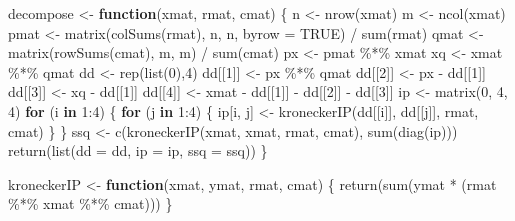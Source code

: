 \documentclass[
  12pt,
  letterpaper,
  DIV=11,
  numbers=noendperiod]{scrartcl}
\newenvironment{Shaded}{\begin{snugshade}}{\end{snugshade}}
\newcommand{\AttributeTok}[1]{\textcolor[rgb]{0.40,0.45,0.13}{#1}}
\newcommand{\ConstantTok}[1]{\textcolor[rgb]{0.56,0.35,0.01}{#1}}
\newcommand{\ControlFlowTok}[1]{\textcolor[rgb]{0.00,0.23,0.31}{\textbf{#1}}}
\newcommand{\DecValTok}[1]{\textcolor[rgb]{0.68,0.00,0.00}{#1}}
\newcommand{\FunctionTok}[1]{\textcolor[rgb]{0.28,0.35,0.67}{#1}}
\newcommand{\NormalTok}[1]{\textcolor[rgb]{0.00,0.23,0.31}{#1}}
\newcommand{\OtherTok}[1]{\textcolor[rgb]{0.00,0.23,0.31}{#1}}
\newcommand{\SpecialCharTok}[1]{\textcolor[rgb]{0.37,0.37,0.37}{#1}}
\begin{document}
\begin{Shaded}
\begin{Highlighting}[]
\NormalTok{decompose }\OtherTok{\textless{}{-}} \ControlFlowTok{function}\NormalTok{(xmat, rmat, cmat) \{}
\NormalTok{  n }\OtherTok{\textless{}{-}} \FunctionTok{nrow}\NormalTok{(xmat)}
\NormalTok{  m }\OtherTok{\textless{}{-}} \FunctionTok{ncol}\NormalTok{(xmat)}
\NormalTok{  pmat }\OtherTok{\textless{}{-}} \FunctionTok{matrix}\NormalTok{(}\FunctionTok{colSums}\NormalTok{(rmat), n, n, }\AttributeTok{byrow =} \ConstantTok{TRUE}\NormalTok{) }\SpecialCharTok{/} \FunctionTok{sum}\NormalTok{(rmat)}
\NormalTok{  qmat }\OtherTok{\textless{}{-}} \FunctionTok{matrix}\NormalTok{(}\FunctionTok{rowSums}\NormalTok{(cmat), m, m) }\SpecialCharTok{/} \FunctionTok{sum}\NormalTok{(cmat)}
\NormalTok{  px }\OtherTok{\textless{}{-}}\NormalTok{ pmat }\SpecialCharTok{\%*\%}\NormalTok{ xmat}
\NormalTok{  xq }\OtherTok{\textless{}{-}}\NormalTok{ xmat }\SpecialCharTok{\%*\%}\NormalTok{ qmat}
\NormalTok{  dd }\OtherTok{\textless{}{-}} \FunctionTok{rep}\NormalTok{(}\FunctionTok{list}\NormalTok{(}\DecValTok{0}\NormalTok{),}\DecValTok{4}\NormalTok{) }
\NormalTok{  dd[[}\DecValTok{1}\NormalTok{]] }\OtherTok{\textless{}{-}}\NormalTok{ px }\SpecialCharTok{\%*\%}\NormalTok{ qmat}
\NormalTok{  dd[[}\DecValTok{2}\NormalTok{]] }\OtherTok{\textless{}{-}}\NormalTok{ px }\SpecialCharTok{{-}}\NormalTok{ dd[[}\DecValTok{1}\NormalTok{]]}
\NormalTok{  dd[[}\DecValTok{3}\NormalTok{]] }\OtherTok{\textless{}{-}}\NormalTok{ xq }\SpecialCharTok{{-}}\NormalTok{ dd[[}\DecValTok{1}\NormalTok{]]}
\NormalTok{  dd[[}\DecValTok{4}\NormalTok{]] }\OtherTok{\textless{}{-}}\NormalTok{ xmat }\SpecialCharTok{{-}}\NormalTok{ dd[[}\DecValTok{1}\NormalTok{]] }\SpecialCharTok{{-}}\NormalTok{ dd[[}\DecValTok{2}\NormalTok{]] }\SpecialCharTok{{-}}\NormalTok{ dd[[}\DecValTok{3}\NormalTok{]]}
\NormalTok{  ip }\OtherTok{\textless{}{-}} \FunctionTok{matrix}\NormalTok{(}\DecValTok{0}\NormalTok{, }\DecValTok{4}\NormalTok{, }\DecValTok{4}\NormalTok{)}
  \ControlFlowTok{for}\NormalTok{ (i }\ControlFlowTok{in} \DecValTok{1}\SpecialCharTok{:}\DecValTok{4}\NormalTok{) \{}
    \ControlFlowTok{for}\NormalTok{ (j }\ControlFlowTok{in} \DecValTok{1}\SpecialCharTok{:}\DecValTok{4}\NormalTok{) \{}
\NormalTok{      ip[i, j] }\OtherTok{\textless{}{-}} \FunctionTok{kroneckerIP}\NormalTok{(dd[[i]], dd[[j]], rmat, cmat)}
\NormalTok{    \}}
\NormalTok{  \}}
\NormalTok{  ssq }\OtherTok{\textless{}{-}} \FunctionTok{c}\NormalTok{(}\FunctionTok{kroneckerIP}\NormalTok{(xmat, xmat, rmat, cmat), }\FunctionTok{sum}\NormalTok{(}\FunctionTok{diag}\NormalTok{(ip)))}
  \FunctionTok{return}\NormalTok{(}\FunctionTok{list}\NormalTok{(}\AttributeTok{dd =}\NormalTok{ dd, }\AttributeTok{ip =}\NormalTok{ ip, }\AttributeTok{ssq =}\NormalTok{ ssq))}
\NormalTok{\}}

\NormalTok{kroneckerIP }\OtherTok{\textless{}{-}} \ControlFlowTok{function}\NormalTok{(xmat, ymat, rmat, cmat) \{}
  \FunctionTok{return}\NormalTok{(}\FunctionTok{sum}\NormalTok{(ymat }\SpecialCharTok{*}\NormalTok{ (rmat }\SpecialCharTok{\%*\%}\NormalTok{ xmat }\SpecialCharTok{\%*\%}\NormalTok{ cmat)))}
\NormalTok{\}}
\end{Highlighting}
\end{Shaded}
\end{document}
